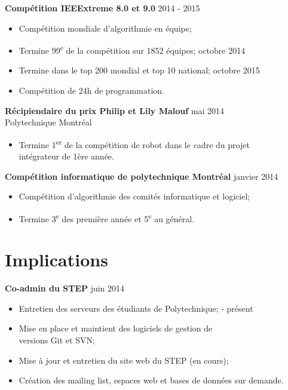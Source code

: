 \documentclass[margin]{res}
\begin{document}
\begin{resume}
  {\bf Comp\'etition IEEExtreme 8.0 et 9.0} \hfill 2014 - 2015
  \begin{itemize} \itemsep -2pt
  \item Comp\'etition mondiale d'algorithmie en \'equipe;
  \item Termine 99\textsuperscript{e} de la comp\'etition sur 1852 \'equipes; \hfill octobre 2014
  \item Termine dans le top 200 mondial et top 10 national; \hfill octobre 2015
  \item Comp\'etition de 24h de programmation.
  \end{itemize}
  
  {\bf R\'{e}cipiendaire du prix Philip et Lily Malouf} \hfill mai 2014\\
  Polytechnique Montr\'eal
  \begin{itemize} \itemsep -2pt
  \item Termine 1\textsuperscript{er} de la comp\'{e}tition de robot dans le cadre du projet\\   int\'{e}grateur de 1\`{e}re ann\'{e}e.
  \end{itemize}
  
  {\bf Comp\'{e}tition informatique de polytechnique Montr\'{e}al} \hfill janvier 2014
  \begin{itemize} \itemsep -2pt
  \item Comp\'{e}tition d'algorithmie des comit\'{e}s informatique et logiciel;
  \item Termine 3\textsuperscript{e} des premi\`{e}re ann\'{e}e et 5\textsuperscript{e} au g\'{e}n\'{e}ral.
  \end{itemize}


  \section{Implications}
  
  {\bf Co-admin du STEP} \hfill juin 2014
  \begin{itemize} \itemsep -2pt
  \item Entretien des serveurs des \'etudiants de Polytechnique; \hfill - pr\'esent
  \item Mise en place et maintient des logiciels de gestion de\\ versions Git et SVN;
  \item Mise \`{a} jour et entretien du site web du STEP (en cours);
  \item Cr\'{e}ation des mailing list, espaces web et bases de donn\'ees sur demande.
  \end{itemize}
  

\end{resume}
\end{document}
